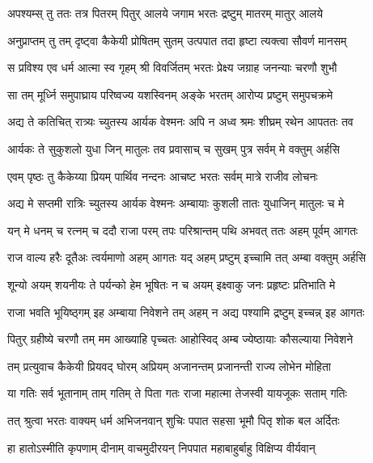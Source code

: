 
\twolineshloka
{अपश्यम्स् तु ततः तत्र पितरम् पितुर् आलये}
{जगाम भरतः द्रष्टुम् मातरम् मातुर् आलये} %

\twolineshloka
{अनुप्राप्तम् तु तम् दृष्ट्वा कैकेयी प्रोषितम् सुतम्}
{उत्पपात तदा हृष्टा त्यक्त्वा सौवर्ण मानसम्} %

\twolineshloka
{स प्रविश्य एव धर्म आत्मा स्व गृहम् श्री विवर्जितम्}
{भरतः प्रेक्ष्य जग्राह जनन्याः चरणौ शुभौ} %

\twolineshloka
{सा तम् मूर्ध्नि समुपाघ्राय परिष्वज्य यशस्विनम्}
{अङ्के भरतम् आरोप्य प्रष्टुम् समुपचक्रमे} %

\twolineshloka
{अद्य ते कतिचित् रात्र्यः च्युतस्य आर्यक वेश्मनः}
{अपि न अध्व श्रमः शीघ्रम् रथेन आपततः तव} %

\twolineshloka
{आर्यकः ते सुकुशलो युधा जिन् मातुलः तव}
{प्रवासाच् च सुखम् पुत्र सर्वम् मे वक्तुम् अर्हसि} %

\twolineshloka
{एवम् पृष्ठः तु कैकेय्या प्रियम् पार्थिव नन्दनः}
{आचष्ट भरतः सर्वम् मात्रे राजीव लोचनः} %

\twolineshloka
{अद्य मे सप्तमी रात्रिः च्युतस्य आर्यक वेश्मनः}
{अम्बायाः कुशली तातः युधाजिन् मातुलः च मे} %

\twolineshloka
{यन् मे धनम् च रत्नम् च ददौ राजा परम् तपः}
{परिश्रान्तम् पथि अभवत् ततः अहम् पूर्वम् आगतः} %

\twolineshloka
{राज वाल्य हरैः दूतैअः त्वर्यमाणो अहम् आगतः}
{यद् अहम् प्रष्टुम् इच्चामि तत् अम्बा वक्तुम् अर्हसि} %

\twolineshloka
{शून्यो अयम् शयनीयः ते पर्यन्को हेम भूषितः}
{न च अयम् इक्ष्वाकु जनः प्रहृष्टः प्रतिभाति मे} %

\twolineshloka
{राजा भवति भूयिष्ठ्गम् इह अम्बाया निवेशने}
{तम् अहम् न अद्य पश्यामि द्रष्टुम् इच्चन्न् इह आगतः} %

\twolineshloka
{पितुर् ग्रहीष्ये चरणौ तम् मम आख्याहि पृच्चतः}
{आहोस्विद् अम्ब ज्येष्ठायाः कौसल्याया निवेशने} %

\twolineshloka
{तम् प्रत्युवाच कैकेयी प्रियवद् घोरम् अप्रियम्}
{अजानन्तम् प्रजानन्ती राज्य लोभेन मोहिता} %

\twolineshloka
{या गतिः सर्व भूतानाम् ताम् गतिम् ते पिता गतः}
{राजा महात्मा तेजस्वी यायजूकः सताम् गतिः} %

\twolineshloka
{तत् श्रुत्वा भरतः वाक्यम् धर्म अभिजनवान् शुचिः}
{पपात सहसा भूमौ पितृ शोक बल अर्दितः} %

\twolineshloka
{हा हातोऽस्मीति कृपणाम् दीनाम् वाचमुदीरयन्}
{निपपात महाबाहुर्बाहु विक्षिप्य वीर्यवान्} %

